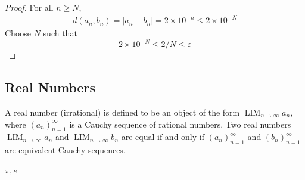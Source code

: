 \documentclass{blog}
\DeclareMathOperator{\LIM}{LIM}
\begin{document}
\begin{proof}
  For all $n \geq N$,
  \begin{gather*}
    d(a_{n}, b_{n}) = |a_{n} - b_{n}| = 2 \times 10^{-n} \leq 2 \times 10^{-N}
  \end{gather*}
  Choose $N$ such that
  \begin{equation*}
    2 \times 10^{-N} \leq 2 / N \leq \varepsilon
  \end{equation*}
\end{proof}

\subsection{Real Numbers}
\begin{definition}[$\mathbb{R}$]
  A real number (irrational) is defined to be an object of the form
  $\LIM_{n \to \infty} a_{n}$,
  where $(a_{n})_{n = 1}^{\infty}$ is a Cauchy sequence of rational numbers.
  Two real numbers $\LIM_{n \to \infty} a_{n}$ and $\LIM_{n \to \infty} b_{n}$ are equal
  if and only if $(a_{n})_{n = 1}^{\infty}$ and $(b_{n})_{n = 1}^{\infty}$ are equivalent Cauchy sequences.
\end{definition}

\begin{definition}
  $\pi, e$
\end{definition}
\end{document}

